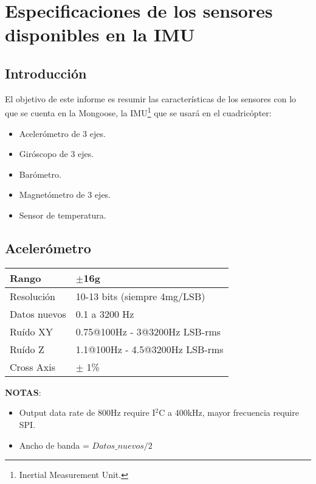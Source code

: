 \documentclass[spanish,12pt,a4paper,titlepage]{report}
\begin{document}
\chapter{Especificaciones de los sensores disponibles en la IMU}
\label{chap-specs-sensores}


\section{Introducción}
\label{sec:intro}

El objetivo de este informe es resumir las características de los sensores con lo que se cuenta en la Mongoose, la IMU\footnote{Inertial Measurement Unit.} que se usará en el cuadricópter:
\begin{itemize}
\item Acelerómetro de 3 ejes.
\item Giróscopo de 3 ejes.
\item Barómetro.
\item Magnetómetro de 3 ejes.
\item Sensor de temperatura.
\end{itemize}

\newpage
\section{Acelerómetro}
\label{sec:acc}

\begin{table}[H]
\begin{center}
\begin{tabular}{|p{3cm}|p{6.5cm}|}
\hline
Rango & $\pm$16g \\
\hline
Resolución & 10-13 bits (siempre 4mg/LSB) \\
\hline
Datos nuevos &  0.1 a 3200 Hz\\
\hline
Ruído XY & 0.75@100Hz - 3@3200Hz LSB-rms\\
\hline
Ruído Z & 1.1@100Hz - 4.5@3200Hz LSB-rms\\
\hline
Cross Axis & $\pm$ 1\% \\
\hline
\end{tabular}
\label{tab:acc}
\end{center}
\end{table}

\textbf{NOTAS}:
\begin{itemize}
\item Output data rate de 800Hz require I$^2$C a 400kHz, mayor frecuencia require SPI.
\item Ancho de banda = $Datos\_nuevos/2$
\end{itemize}
\end{document}
